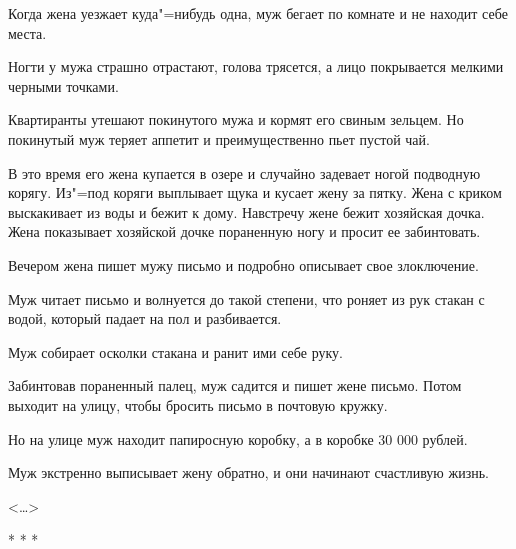 Когда жена уезжает куда"=нибудь одна, муж бегает по комнате и не находит себе места.

Ногти у мужа страшно отрастают, голова трясется, а лицо покрывается мелкими черными точками.

Квартиранты утешают покинутого мужа и кормят его свиным зельцем. Но покинутый муж теряет аппетит и преимущественно пьет пустой чай.

В это время его жена купается в озере и случайно задевает ногой подводную корягу. Из"=под коряги выплывает щука и кусает жену за пятку. Жена с криком выскакивает из воды и бежит к дому. Навстречу жене бежит хозяйская дочка. Жена показывает хозяйской дочке пораненную ногу и просит ее забинтовать.

Вечером жена пишет мужу письмо и подробно описывает свое злоключение.

Муж читает письмо и волнуется до такой степени, что роняет из рук стакан с водой, который падает на пол и разбивается.

Муж собирает осколки стакана и ранит ими себе руку.

Забинтовав пораненный палец, муж садится и пишет жене письмо. Потом выходит на улицу, чтобы бросить письмо в почтовую кружку.

Но на улице муж находит папиросную коробку, а в коробке 30 000 рублей.

Муж экстренно выписывает жену обратно, и они начинают счастливую жизнь.

\begin{flushright}
<\dots{}>
\end{flushright}

\begin{center}
* * * 
\end{center}